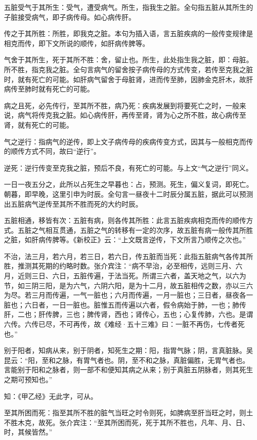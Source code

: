 \documentclass[draft,12pt]{ctexbook}
\begin{document}
\begin{jiaozhu}
	\item 五脏受气于其所生：受气，遭受病气。所生，指我生之脏。全句指五脏从其所生的子脏接受病气，即子病传母。如心病传肝。
	\item 传之于其所胜：所胜，即我克之脏。本句为插入语，言五脏疾病的一般传变规律是相克而传，即下文所说的顺传，如肝病传脾等。
	\item 气舍于其所生，死于其所不胜：舍，留止也。所生，此处指生我之脏，即：母脏。所不胜，指克我之脏。全句言病气的留舍按子病传母的方式传变，若传至克我之脏时，就有死亡的可能。如肝病气留舍于母脏肾，进而传至肺，因肺金克肝木，故肝病传至肺时就有死亡的可能。
	\item 病之且死，必先传行，至其所不胜，病乃死：疾病发展到将要死亡之时，一般来说，病气将传克我之脏。如心病传肝，再传至肾，肾为心之所不胜，故心病传至肾，就有死亡的可能。
	\item 气之逆行：指病气的逆传，即上文子病传母的疾病传变方式，因其与一般相克而传的顺传方式不同，故曰“逆行”。
	\item 逆死：逆行传变至克我之脏，预后不良，有死亡的可能。与上文“气之逆行”同义。
	\item 一日一夜五分之，此所以占死生之早暮也：占，预测。死生，偏义复词，即死亡。朝暮，即早晚，这里引申为时辰。全句言一昼夜十二时辰分属五脏，据此可以预测出五脏病气逆传至其所不胜而死的大约时辰。
	\item 五脏相通，移皆有次：五脏有病，则各传其所胜：此言五脏疾病相克而传的顺传方式。五脏之气相互贯通，五脏之气的转移有一定的次序，故五脏有病一般传其所胜之脏，如肝病传脾等。《新校正》云：“上文既言逆传，下文所言乃顺传之次也。”
	\item 不治，法三月，若六月，若三日，若六日，传五脏而当死：此指五脏病气各传其所胜，推测其死期的约略时数。张介宾注：“病不早治，必至相传，远则三月、六月，近则三日、六日，五脏传遍，于法当死。所谓三六者，盖天地之气，以六为节，如三阴三阳，是为六气，六阴六阳，是为十二月，故五脏相传之数，亦以三六为尽。若三月而传遍，一气一脏也；六月而传遍，一月一脏也；三日者，昼夜各一脏也；六日者，一日一脏也。脏惟五而传遍以六者，假令病始于肺，一也；肺传肝，二也；肝传脾，三也；脾传肾，西也；肾传心，五也；心复传肺，六也。是谓六传。六传已尽，不可再传，故《难经·五十三难》曰：一脏不再伤，七传者死也。”
	\item 别于阳者，知病从来，别于阴者，知死生之期：阳，指胃气脉；阴，言真脏脉。吴昆云：“阳，至和之脉，有胃气者也。阴，至不和之脉，真脏偏胜，无胃气者也。言能别于阳和之脉者，则一部不和便知其病之从来；别于真脏五阴脉者，则其死生之期可预知也。”
	\item 知：《甲乙经》无此字，可从。
	\item 至其所困而死：指至其所不胜的脏气当旺之时令则死，如脾病至肝当旺之时，则土不胜木克，故死。张介宾注：“至其所困而死，死于其所不胜也，凡年、月、日、时，其候皆然。”
\end{jiaozhu}
\end{document}
